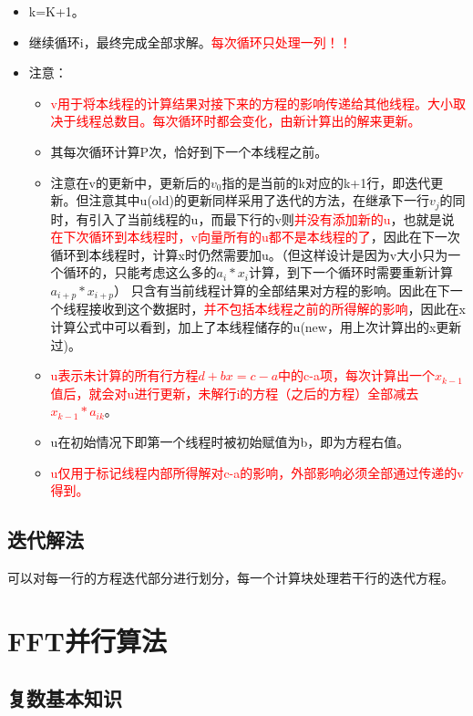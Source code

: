 \documentclass[UTF8]{article}%
\begin{document}
\begin{itemize}
    \item k=K+1。
    \item 继续循环i，最终完成全部求解。\textcolor{red}{每次循环只处理一列！！}
    \item 注意：{
        \begin{itemize}
            \item \textcolor{red}{v用于将本线程的计算结果对接下来的方程的影响传递给其他线程。大小取决于线程总数目。每次循环时都会变化，由新计算出的解来更新。}
            \item 其每次循环计算P次，恰好到下一个本线程之前。
            \item 注意在v的更新中，更新后的$v_0$指的是当前的k对应的k+1行，即迭代更新。但注意其中u(old)的更新同样采用了迭代的方法，在继承下一行$v_j$的同时，有引入了当前线程的u，而最下行的v则\textcolor{red}{并没有添加新的u}，也就是说\textcolor{red}{在下次循环到本线程时，v向量所有的u都不是本线程的了}，因此在下一次循环到本线程时，计算x时仍然需要加u。（但这样设计是因为v大小只为一个循环的，只能考虑这么多的$a_i*x_i$计算，到下一个循环时需要重新计算$a_{i+p}*x_{i+p}$）
            只含有当前线程计算的全部结果对方程的影响。因此在下一个线程接收到这个数据时，\textcolor{red}{并不包括本线程之前的所得解的影响}，因此在x计算公式中可以看到，加上了本线程储存的u(new，用上次计算出的x更新过)。
            \item \textcolor{red}{u表示未计算的所有行方程$d+bx=c-a$中的c-a项，每次计算出一个$x_{k-1}$值后，就会对u进行更新，未解行i的方程（之后的方程）全部减去$x_{k-1}*a_{ik}$}。
            \item u在初始情况下即第一个线程时被初始赋值为b，即为方程右值。
            \item \textcolor{red}{u仅用于标记线程内部所得解对c-a的影响，外部影响必须全部通过传递的v得到。}
        \end{itemize}
    }
\end{itemize}

\subsection{迭代解法}

可以对每一行的方程迭代部分进行划分，每一个计算块处理若干行的迭代方程。

\section{FFT并行算法}

\subsection{复数基本知识}
\end{document}
